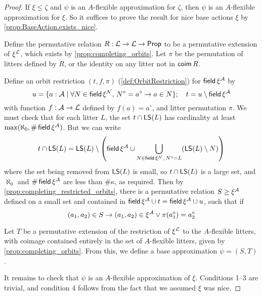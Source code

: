 \begin{proof}
  \leanok
  If \( \xi \leq \zeta \) and \( \psi \) is an \( A \)-flexible approximation for \( \zeta \), then \( \psi \) is an \( A \)-flexible approximation for \( \xi \).
  So it suffices to prove the result for nice base actions \( \xi \) by \cref{prop:BaseAction.exists_nice}.

  Define the permutative relation \( R : {\mathcal L} \to {\mathcal L} \to \mathsf{Prop} \) to be a permutative extension of \( \xi^{\mathcal L} \), which exists by \cref{prop:completing_orbits}.
  Let \( \pi \) be the permutation of litters defined by \( R \), or the identity on any litter not in \( \operatorname{\mathsf{coim}} R \).

  Define an orbit restriction \( (t, f, \pi) \) (\cref{def:OrbitRestriction}) for \( \operatorname{\mathsf{field}} \xi^{\mathcal A} \) by
  \[ u = \{ a : {\mathcal A} \mid \forall N \in \operatorname{\mathsf{field}} \xi^{\mathcal N},\, N^\circ = a^\circ \to a \in N \};\quad t = u \setminus \operatorname{\mathsf{field}} \xi^{\mathcal A} \]
  with function \( f : {\mathcal A} \to {\mathcal L} \) defined by \( f(a) = a^\circ \), and litter permutation \( \pi \).
  We must check that for each litter \( L \), the set \( t \cap \operatorname{\mathsf{LS}}(L) \) has cardinality at least \( \max(\aleph_0, \#\operatorname{\mathsf{field}} \xi^{\mathcal A}) \).
  But we can write
  \[ t \cap \operatorname{\mathsf{LS}}(L) = \operatorname{\mathsf{LS}}(L) \setminus \left( \operatorname{\mathsf{field}} \xi^{\mathcal A} \cup \bigcup_{N \in \operatorname{\mathsf{field}} \xi^{\mathcal N},\, N^\circ = L} (\operatorname{\mathsf{LS}}(L) \setminus N) \right) \]
  where the set being removed from \( \operatorname{\mathsf{LS}}(L) \) is small, so \( t \cap \operatorname{\mathsf{LS}}(L) \) is a large set, and \( \aleph_0 \) and \( \#\operatorname{\mathsf{field}} \xi^{\mathcal A} \) are less than \( \#\kappa \), as required.
  Then by \cref{prop:completing_restricted_orbits}, there is a permutative relation \( S \geq \xi^{\mathcal A} \) defined on a small set and contained in \( \operatorname{\mathsf{field}} \xi^{\mathcal A} \cup t = \operatorname{\mathsf{field}} \xi^{\mathcal A} \cup u \), such that if
  \[ (a_1, a_2) \in S \to (a_1, a_2) \in \xi^{\mathcal A} \vee \pi(a_1^\circ) = a_2^\circ \]

  Let \( T \) be a permutative extension of the restriction of \( \xi^{\mathcal L} \) to the \( A \)-flexible litters, with coimage contained entirely in the set of \( A \)-flexible litters, given by \cref{prop:completing_orbits}.
  From this, we define a base approximation \( \psi = (S, T) \).

  It remains to check that \( \psi \) is an \( A \)-flexible approximation of \( \xi \).
  Conditions 1--3 are trivial, and condition 4 follows from the fact that we assumed \( \xi \) was nice.


\end{proof}

